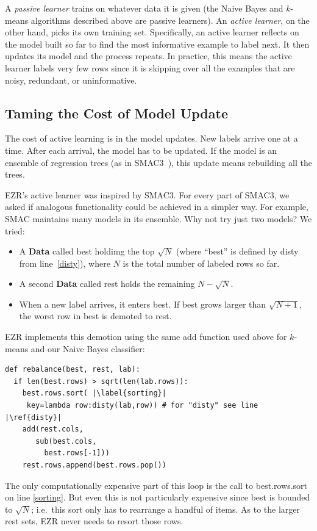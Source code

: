 \documentclass[AMA,STIX2COL]{WileyNJDv5}
\newcommand{\cls}[1]{%
  \setlength{\fboxsep}{1.5pt}%
  \colorbox{clsbg}{\sffamily\bfseries{#1}}%
}
\begin{document}
{ A {\em passive learner} trains on whatever data it is given (the Naive Bayes and
 $k$-means algorithms described above are passive learners). An {\em active
learner}, on the other hand,  picks its own training set. Specifically, an active learner reflects on the
model built so far to find the  most informative    example to label next. 
It then updates its model and the process repeats. In practice,
this means the active learner labels very few rows since it is 
skipping over all the  examples that are noisy, redundant, or
uninformative.  

\subsection{Taming the Cost of Model Update}

The cost of active learning is in the model updates. New labels arrive
one at a time. After each arrival, the model has to be updated. If
the model is an ensemble of regression trees (as in
SMAC3~\cite{hutter2011sequential}), this update means rebuilding all the trees.

EZR's active learner 
was inspired by SMAC3. For every part of SMAC3, we asked if   analogous
functionality could be achieved in a simpler way.
For example,   SMAC maintains many models in its ensemble.
Why not try just two models?  We tried:
\begin{itemize}
\item A \cls{Data} called \textsf{best} holdimg the top $\sqrt{N}$
(where ``best'' is defined by \textsf{disty} from line~\ref{disty}), where $N$ is the total number of
labeled rows so far.
\item A second \cls{Data} called \textsf{rest} holds the
remaining $N - \sqrt{N}$.
\item When a new label arrives, it enters \textsf{best}. If
  \textsf{best} grows larger than  $\sqrt{N+1}$, the worst row in
\textsf{best} is demoted to \textsf{rest}.
\end{itemize}
EZR implements this demotion using the same \textsf{add} function used
above for $k$-means and our Naive Bayes classifier:
\begin{verbatim}
def rebalance(best, rest, lab): 
  if len(best.rows) > sqrt(len(lab.rows)):
    best.rows.sort( |\label{sorting}|
     key=lambda row:disty(lab,row)) # for "disty" see line |\ref{disty}|
    add(rest.cols, 
       sub(best.cols,
         best.rows[-1]))
    rest.rows.append(best.rows.pop())
\end{verbatim}
The only computationally expensive part of this loop
is the call to \textsf{best.rows.sort} on line \ref{sorting}. But even this
is not particularly expensive since \textsf{best} is bounded to $\sqrt{N}$;
i.e.\ 
this sort only has to rearrange a handful of items.  As to the larger \textsf{rest} sets,  EZR never needs to resort those rows.

}
\end{document}
